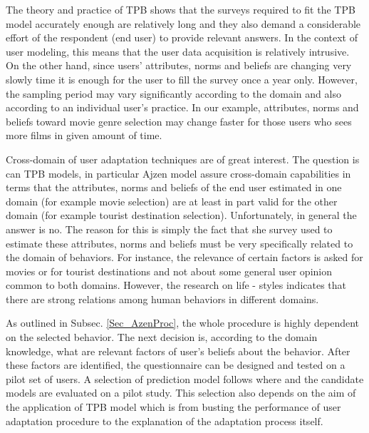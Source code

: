 \documentclass{llncs}
\begin{document}
\vspace{0.6em}
 The theory and practice of TPB shows that the surveys required to fit the TPB model accurately  enough are relatively long and they also demand a considerable effort of the respondent (end user) to provide relevant answers. In the context of user modeling, this means that the user data acquisition is relatively intrusive. On the other hand, since users'  attributes, norms and beliefs are changing very slowly time it is enough for the user to fill the survey once a year only. However, the sampling period may vary significantly according to the domain and also according to an individual user's practice. In our example,  attributes, norms and beliefs toward movie genre selection may change faster for those users who sees more films in given amount of time. 


\vspace{0.6em}
 Cross-domain of user adaptation techniques are of great interest. The question is can TPB models, in particular Ajzen model assure cross-domain capabilities in terms that the attributes, norms and beliefs of the end user estimated in one domain (for example movie selection) are at least in part valid for the other domain (for example tourist destination selection). Unfortunately, in general the answer is no. The reason for this is simply the fact that she survey used to estimate these attributes, norms and beliefs must be very specifically related to the domain of behaviors. For instance, the relevance of certain factors is asked for movies or for tourist destinations and not about some general user opinion common to both domains. However, the research on life - styles \cite{Stadtmueller2013} \cite{Dewberry2013} indicates that there are strong relations among human behaviors in different domains. 

\vspace{0.6em}
 As outlined in Subsec. \ref{Sec_AzenProc}, the whole procedure is highly dependent on the selected behavior. The next decision is, according to the domain knowledge, what are relevant factors of user's beliefs about the behavior. After these factors are identified, the questionnaire can be designed and tested on a pilot set of users. A selection of prediction model follows where and the candidate models are evaluated on a pilot study. This selection also depends on the aim of the application of TPB model which is from busting the performance of user adaptation procedure to the explanation of the adaptation process itself. 
\end{document}
